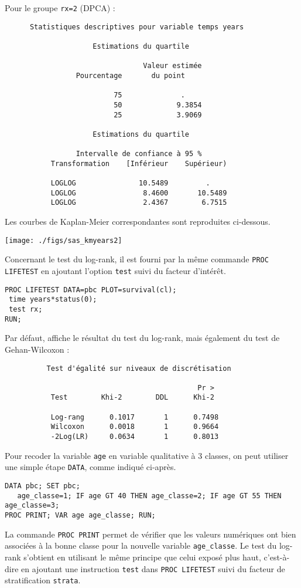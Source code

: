 Pour le groupe \texttt{rx=2} (DPCA) :
\begin{verbatim}
      Statistiques descriptives pour variable temps years

                     Estimations du quartile

                                 Valeur estimée
                 Pourcentage       du point

                          75              .
                          50             9.3854
                          25             3.9069

                     Estimations du quartile

                 Intervalle de confiance à 95 %
           Transformation    [Inférieur    Supérieur)

           LOGLOG               10.5489         .
           LOGLOG                8.4600       10.5489
           LOGLOG                2.4367        6.7515
\end{verbatim}

Les courbes de Kaplan-Meier correspondantes sont reproduites ci-dessous.

\texttt{[image: ./figs/sas\_kmyears2]}

Concernant le test du log-rank, il est fourni par la même commande
\verb|PROC LIFETEST| en ajoutant l'option \verb|test| suivi du facteur
d'intérêt.
\begin{verbatim}
PROC LIFETEST DATA=pbc PLOT=survival(cl);
 time years*status(0);
 test rx;
RUN;
\end{verbatim}
Par défaut, \SAS affiche le résultat du test du log-rank, mais également du
test de Gehan-Wilcoxon :
\begin{verbatim}
          Test d'égalité sur niveaux de discrétisation

                                              Pr >
           Test        Khi-2        DDL      Khi-2

           Log-rang      0.1017       1      0.7498
           Wilcoxon      0.0018       1      0.9664
           -2Log(LR)     0.0634       1      0.8013
\end{verbatim}

Pour recoder la variable \texttt{age} en variable qualitative à 3 classes,
on peut utiliser une simple étape \verb|DATA|, comme indiqué ci-après.
\begin{verbatim}
DATA pbc; SET pbc;
   age_classe=1; IF age GT 40 THEN age_classe=2; IF age GT 55 THEN age_classe=3;
PROC PRINT; VAR age age_classe; RUN;
\end{verbatim}
La commande \verb|PROC PRINT| permet de vérifier que les valeurs numériques
ont bien associées à la bonne classe pour la nouvelle variable
\verb|age_classe|. Le test du log-rank s'obtient en utilisant le même
principe que celui exposé plus haut, c'est-à-dire en ajoutant une
instruction \verb|test| dans \verb|PROC LIFETEST| suivi du facteur de
stratification \verb|strata|.

